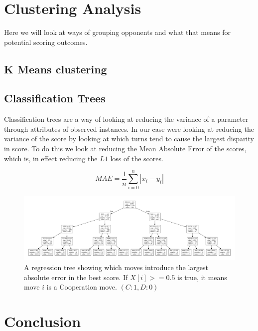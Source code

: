 \section{Clustering Analysis}
Here we will look at ways of grouping opponents and what that means for potential scoring outcomes.
\subsection{K Means clustering}\label{ssec:k_means}


\subsection{Classification Trees}
Classification trees are a way of looking at reducing the variance of a parameter through attributes of observed instances. 
In our case were looking at reducing the variance of the score by looking at which turns tend to cause the largest disparity in score.
To do this we look at reducing the Mean Absolute Error of the scores, which is, in effect reducing the $L1$ loss of the scores.

$$MAE = \frac{1}{n}\sum_{i=0}^n |x_i-y_i|$$

\begin{figure}
    \includegraphics[width=1.0\textwidth, center]{./img/descriptive/reg_tree.pdf}
    \centering
    \caption{A regression tree showing which moves introduce the largest absolute error in the best score. If $X[i]>=0.5$ is true, it means move $i$ is a Cooperation move. $(C:1,D:0)$}\label{fig:reg_tree}
\end{figure}


\section{Conclusion}